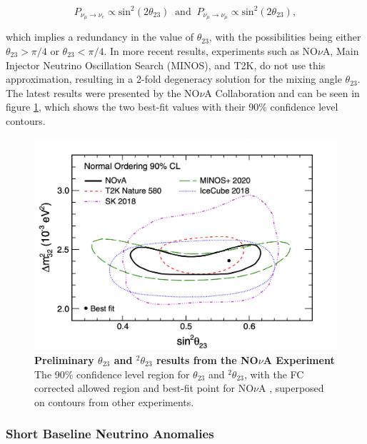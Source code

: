 \begin{equation}
	P_{\nu_\mu \rightarrow \nu_e} \propto \text{sin}^2(2\theta_{23}) \ \text{ and } \ P_{\nu_\mu \rightarrow \nu_\mu} \propto \text{sin}^2(2\theta_{23}),
	\nonumber
\end{equation}

which implies a redundancy in the value of $\theta_{23}$, with the possibilities being either $\theta_{23} > \pi/4$ or $\theta_{23} < \pi/4$. 
In more recent results, experiments such as NO$\nu$A, Main Injector Neutrino Oscillation Search (MINOS), and T2K, do not use this approximation, resulting in a 2-fold degeneracy solution for the mixing angle $\theta_{23}$. The latest results were presented by the NO$\nu$A Collaboration and can be seen in figure \ref{nova_result}, which shows the two best-fit values with their 90\% confidence level contours.

\begin{figure}
	\begin{center}
		\includegraphics[scale=0.7]{Figures/nova_result.png}
		\caption[Preliminary $\theta_{23}$ and $^2\theta_{23}$ results from the NO$\nu$A Experiment]{ {\textbf{Preliminary $\theta_{23}$ and $^2\theta_{23}$ results from the NO$\nu$A Experiment}} \\ The 90\% confidence level region for $\theta_{23}$ and $^2\theta_{23}$, with the FC corrected allowed region and best-fit point for NO$\nu$A \cite{NOVA}, superposed on contours from other experiments.}
		\label{nova_result}	
	\end{center}
\end{figure} 

\subsubsection{Short Baseline Neutrino Anomalies}


